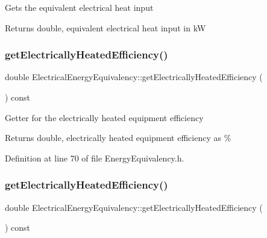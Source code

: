 Gets the equivalent electrical heat input \begin{DoxyReturn}{Returns}
double, equivalent electrical heat input in kW 
\end{DoxyReturn}
\mbox{\label{class_electrical_energy_equivalency_a83438510f522aa045f4b1007fca1d2fd}} 
\subsubsection{\texorpdfstring{get\+Electrically\+Heated\+Efficiency()}{getElectricallyHeatedEfficiency()}\hspace{0.1cm}{\footnotesize\ttfamily [1/3]}}
{\footnotesize\ttfamily double Electrical\+Energy\+Equivalency\+::get\+Electrically\+Heated\+Efficiency (\begin{DoxyParamCaption}{ }\end{DoxyParamCaption}) const\hspace{0.3cm}{\ttfamily [inline]}}

Getter for the electrically heated equipment efficiency

\begin{DoxyReturn}{Returns}
double, electrically heated equipment efficiency as \% 
\end{DoxyReturn}


Definition at line 70 of file Energy\+Equivalency.\+h.

\mbox{\label{class_electrical_energy_equivalency_a83438510f522aa045f4b1007fca1d2fd}} 
\subsubsection{\texorpdfstring{get\+Electrically\+Heated\+Efficiency()}{getElectricallyHeatedEfficiency()}\hspace{0.1cm}{\footnotesize\ttfamily [2/3]}}
{\footnotesize\ttfamily double Electrical\+Energy\+Equivalency\+::get\+Electrically\+Heated\+Efficiency (\begin{DoxyParamCaption}{ }\end{DoxyParamCaption}) const\hspace{0.3cm}{\ttfamily [inline]}}


